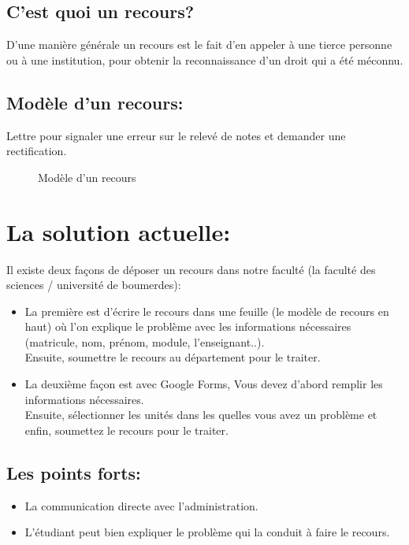 \documentclass[12pt]{report}
\begin{document}
\subsection{C'est quoi un recours?}
D'une manière générale un recours est le fait d'en appeler à une tierce personne ou à une institution, pour obtenir la reconnaissance d'un droit qui a été méconnu.

\subsection{Modèle d’un recours:}
\vspace{0.1in}
Lettre pour signaler une erreur sur le relevé de notes et demander une rectification.

\vspace{0.2in}

\begin{figure}[h]
\centering
\caption{Modèle d’un recours}
\end{figure}

\newpage

\section{La solution actuelle:}
Il existe deux façons de déposer un recours dans notre faculté (la faculté des sciences / université de boumerdes):
\begin{itemize}
    \item La première est d'écrire le recours dans une feuille (le modèle de recours en haut) où l'on explique le problème avec les informations nécessaires (matricule, nom, prénom, module, l'enseignant..).\\Ensuite, soumettre le recours au département pour le traiter.
    \item La deuxième façon est avec Google Forms, Vous devez d'abord remplir les informations nécessaires.\\Ensuite, sélectionner les unités dans les quelles vous avez un problème et enfin, soumettez le recours pour le traiter.
\end{itemize}

\subsection{Les points forts:}
\begin{itemize}
  \item La communication directe avec l'administration.
    \item L'étudiant peut bien expliquer le problème qui la conduit à faire le recours. 
\end{itemize}
\end{document}
